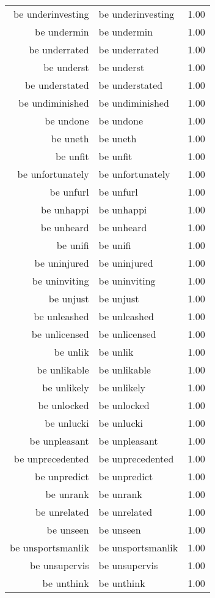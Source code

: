 \begin{table}[ht]
\begin{tabular}{rlr}
  be underinvesting & be underinvesting & 1.00 \\ 
  be undermin & be undermin & 1.00 \\ 
  be underrated & be underrated & 1.00 \\ 
  be underst & be underst & 1.00 \\ 
  be understated & be understated & 1.00 \\ 
  be undiminished & be undiminished & 1.00 \\ 
  be undone & be undone & 1.00 \\ 
  be uneth & be uneth & 1.00 \\ 
  be unfit & be unfit & 1.00 \\ 
  be unfortunately & be unfortunately & 1.00 \\ 
  be unfurl & be unfurl & 1.00 \\ 
  be unhappi & be unhappi & 1.00 \\ 
  be unheard & be unheard & 1.00 \\ 
  be unifi & be unifi & 1.00 \\ 
  be uninjured & be uninjured & 1.00 \\ 
  be uninviting & be uninviting & 1.00 \\ 
  be unjust & be unjust & 1.00 \\ 
  be unleashed & be unleashed & 1.00 \\ 
  be unlicensed & be unlicensed & 1.00 \\ 
  be unlik & be unlik & 1.00 \\ 
  be unlikable & be unlikable & 1.00 \\ 
  be unlikely & be unlikely & 1.00 \\ 
  be unlocked & be unlocked & 1.00 \\ 
  be unlucki & be unlucki & 1.00 \\ 
  be unpleasant & be unpleasant & 1.00 \\ 
  be unprecedented & be unprecedented & 1.00 \\ 
  be unpredict & be unpredict & 1.00 \\ 
  be unrank & be unrank & 1.00 \\ 
  be unrelated & be unrelated & 1.00 \\ 
  be unseen & be unseen & 1.00 \\ 
  be unsportsmanlik & be unsportsmanlik & 1.00 \\ 
  be unsupervis & be unsupervis & 1.00 \\ 
  be unthink & be unthink & 1.00 \\ 

\end{tabular}
\end{table}
